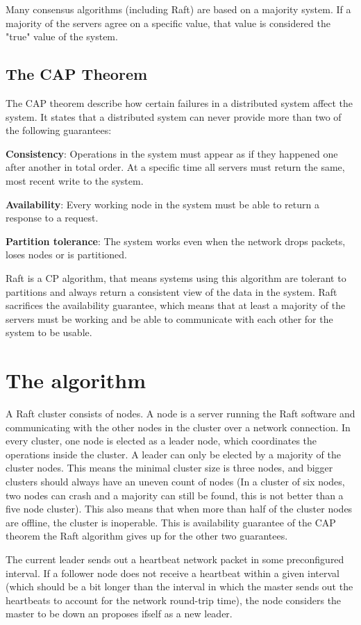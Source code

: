 Many consensus algorithms (including Raft) are based on a majority system. If a majority of the servers agree on a specific value, that value is considered the "true" value of the system.

\subsection{The CAP Theorem}
The CAP theorem describe how certain failures in a distributed system affect the system. It states that a distributed system can never provide more than two of the following guarantees: \cite{cap_theorem}

\textbf{Consistency}: Operations in the system must appear as if they happened one after another in total order. At a specific time all servers must return the same, most recent write to the system.

\textbf{Availability}: Every working node in the system must be able to return a response to a request.

\textbf{Partition tolerance}: The system works even when the network drops packets, loses nodes or is partitioned.

Raft is a CP algorithm, that means systems using this algorithm are tolerant to partitions and always return a consistent view of the data in the system. Raft sacrifices the availability guarantee, which means that at least a majority of the servers must be working and be able to communicate with each other for the system to be usable.

\section{The algorithm}
A Raft cluster consists of nodes. A node is a server running the Raft software and communicating with the other nodes in the cluster over a network connection.
In every cluster, one node is elected as a leader node, which coordinates the operations inside the cluster. A leader can only be elected by
a majority of the cluster nodes. This means the minimal cluster size is three nodes, and bigger clusters should always have an uneven count of nodes (In a cluster
of six nodes, two nodes can crash and a majority can still be found, this is not better than a five node cluster).
This also means that when more than half of the cluster nodes are offline, the cluster is inoperable. This is availability guarantee of the CAP theorem the Raft algorithm gives up
for the other two guarantees. 

The current leader sends out a heartbeat network packet in some preconfigured interval. If a follower node does not receive a heartbeat within a given interval (which should be a bit longer than the interval in which the master sends out the heartbeats to account for the network round-trip time), the node considers the master to be down an proposes ifself as a new leader.


